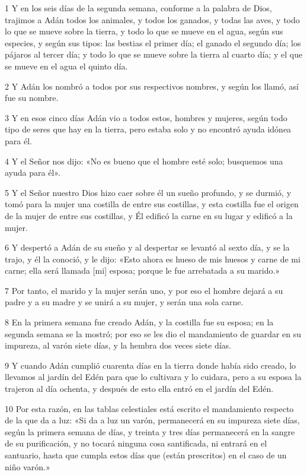 \par 1 Y en los seis días de la segunda semana, conforme a la palabra de Dios, trajimos a Adán todos los animales, y todos los ganados, y todas las aves, y todo lo que se mueve sobre la tierra, y todo lo que se mueve en el agua, según sus especies, y según sus tipos: las bestias el primer día; el ganado el segundo día; los pájaros al tercer día; y todo lo que se mueve sobre la tierra al cuarto día; y el que se mueve en el agua el quinto día.
\par 2 Y Adán los nombró a todos por sus respectivos nombres, y según los llamó, así fue su nombre.
\par 3 Y en esos cinco días Adán vio a todos estos, hombres y mujeres, según todo tipo de seres que hay en la tierra, pero estaba solo y no encontró ayuda idónea para él.
\par 4 Y el Señor nos dijo: «No es bueno que el hombre esté solo; busquemos una ayuda para él».
\par 5 Y el Señor nuestro Dios hizo caer sobre él un sueño profundo, y se durmió, y tomó para la mujer una costilla de entre sus costillas, y esta costilla fue el origen de la mujer de entre sus costillas, y Él edificó la carne en su lugar y edificó a la mujer.
\par 6 Y despertó a Adán de su sueño y al despertar se levantó al sexto día, y se la trajo, y él la conoció, y le dijo: «Esto ahora es hueso de mis huesos y carne de mi carne; ella será llamada [mi] esposa; porque le fue arrebatada a su marido.»
\par 7 Por tanto, el marido y la mujer serán uno, y por eso el hombre dejará a su padre y a su madre y se unirá a su mujer, y serán una sola carne.
\par 8 En la primera semana fue creado Adán, y la costilla fue su esposa; en la segunda semana se la mostró; por eso se les dio el mandamiento de guardar en su impureza, al varón siete días, y la hembra dos veces siete días.
\par 9 Y cuando Adán cumplió cuarenta días en la tierra donde había sido creado, lo llevamos al jardín del Edén para que lo cultivara y lo cuidara, pero a su esposa la trajeron al día ochenta, y después de esto ella entró en el jardín del Edén.
\par 10 Por esta razón, en las tablas celestiales está escrito el mandamiento respecto de la que da a luz: «Si da a luz un varón, permanecerá en su impureza siete días, según la primera semana de días, y treinta y tres días permanecerá en la sangre de su purificación, y no tocará ninguna cosa santificada, ni entrará en el santuario, hasta que cumpla estos días que (están prescritos) en el caso de un niño varón.»
